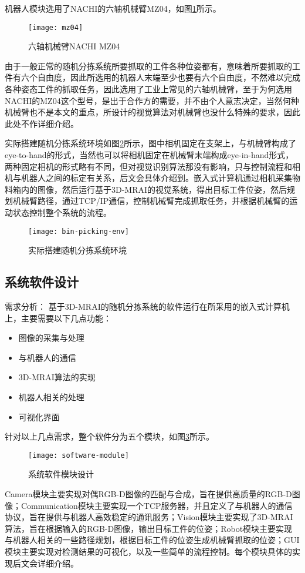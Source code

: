 机器人模块选用了NACHI的六轴机械臂MZ04，如图\ref{fig:mz04}所示。
\begin{figure}[ht]
  \centering
  \texttt{[image: mz04]}
  \caption{六轴机械臂NACHI MZ04}
  \label{fig:mz04}
\end{figure}
由于一般正常的随机分拣系统所要抓取的工件各种位姿都有，意味着所要抓取的工件有六个自由度，因此所选用的机器人末端至少也要有六个自由度，不然难以完成各种姿态工件的抓取任务，因此选用了工业上常见的六轴机械臂，至于为何选用NACHI的MZ04这个型号，是出于合作方的需要，并不由个人意志决定，当然何种机械臂也不是本文的重点，所设计的视觉算法对机械臂也没什么特殊的要求，因此此处不作详细介绍。

实际搭建随机分拣系统环境如图\ref{fig:bin-picking-env}所示，图中相机固定在支架上，与机械臂构成了eye-to-hand的形式，当然也可以将相机固定在机械臂末端构成eye-in-hand形式，两种固定相机的形式略有不同，但对视觉识别算法那没有影响，只与控制流程和相机与机器人之间的标定有关系，后文会具体介绍到。嵌入式计算机通过相机采集物料箱内的图像，然后运行基于3D-MRAI的视觉系统，得出目标工件位姿，然后规划机械臂路径，通过TCP/IP通信，控制机械臂完成抓取任务，并根据机械臂的运动状态控制整个系统的流程。
\begin{figure}[ht]
  \centering
  \texttt{[image: bin-picking-env]}
  \caption{实际搭建随机分拣系统环境}
  \label{fig:bin-picking-env}
\end{figure}

\subsection{系统软件设计}
{\kai 需求分析：}
基于3D-MRAI的随机分拣系统的软件运行在所采用的嵌入式计算机上，主要需要以下几点功能：
\begin{itemize}
\item 图像的采集与处理
\item 与机器人的通信
\item 3D-MRAI算法的实现
\item 机器人相关的处理
\item 可视化界面
\end{itemize}
针对以上几点需求，整个软件分为五个模块，如图\ref{fig:software-module}所示。
\begin{figure}[ht]
  \centering
  \texttt{[image: software-module]}
  \caption{系统软件模块设计}
  \label{fig:software-module}
\end{figure}
Camera模块主要实现对偶RGB-D图像的匹配与合成，旨在提供高质量的RGB-D图像；Communication模块主要实现一个TCP服务器，并且定义了与机器人的通信协议，旨在提供与机器人高效稳定的通讯服务；Vision模块主要实现了3D-MRAI算法，旨在根据输入的RGB-D图像，输出目标工件的位姿；Robot模块主要实现与机器人相关的一些路径规划，根据目标工件的位姿生成机械臂抓取的位姿；GUI模块主要实现对检测结果的可视化，以及一些简单的流程控制。每个模块具体的实现后文会详细介绍。

